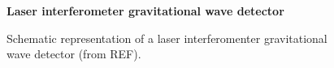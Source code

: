 \begin{figure}[H]
\centering
    \textbf{Laser interferometer gravitational wave detector}\par\medskip
{}
\caption{Schematic representation of a laser interferomenter gravitational wave detector (from REF).}
\label{interferometer}
\end{figure}



